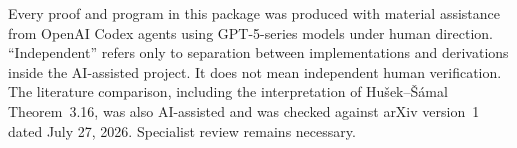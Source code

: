 \documentclass[11pt]{article}
\theoremstyle{definition}
\theoremstyle{remark}
\numberwithin{equation}{section}
\begin{document}
Every proof and program in this package was produced with material
assistance from OpenAI Codex agents using GPT-5-series models under
human direction.  ``Independent'' refers only to separation between
implementations and derivations inside the AI-assisted project.  It does
not mean independent human verification.  The literature comparison,
including the interpretation of Hu\v{s}ek--\v{S}\'amal
Theorem~3.16, was also AI-assisted and was checked against arXiv
version~1 dated July 27, 2026.  Specialist review remains necessary.



\end{document}
